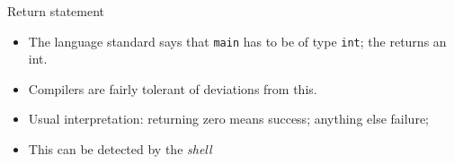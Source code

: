 \begin{slide}{Return statement}
  \label{sl:main-int}
  \begin{itemize}
  \item The language standard says that \lstinline{main} has to be of type
    \lstinline{int}; the  returns an int.
  \item Compilers are fairly tolerant of deviations from this.
  \item Usual interpretation: returning zero means success; anything else failure;
  \item This  can be detected by the
    \emph{shell}
  \end{itemize}
\end{slide}
